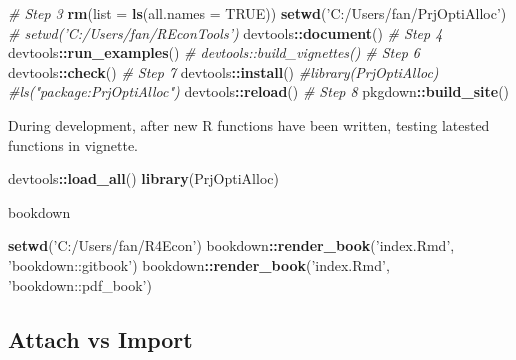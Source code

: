 \documentclass[
]{article}
\newenvironment{Shaded}{\begin{snugshade}}{\end{snugshade}}
\newcommand{\CommentTok}[1]{\textcolor[rgb]{0.56,0.35,0.01}{\textit{#1}}}
\newcommand{\DataTypeTok}[1]{\textcolor[rgb]{0.13,0.29,0.53}{#1}}
\newcommand{\KeywordTok}[1]{\textcolor[rgb]{0.13,0.29,0.53}{\textbf{#1}}}
\newcommand{\NormalTok}[1]{#1}
\newcommand{\OperatorTok}[1]{\textcolor[rgb]{0.81,0.36,0.00}{\textbf{#1}}}
\newcommand{\OtherTok}[1]{\textcolor[rgb]{0.56,0.35,0.01}{#1}}
\newcommand{\StringTok}[1]{\textcolor[rgb]{0.31,0.60,0.02}{#1}}
\begin{document}
\begin{Shaded}
\begin{Highlighting}[]
\CommentTok{# Step 3}
\KeywordTok{rm}\NormalTok{(}\DataTypeTok{list =} \KeywordTok{ls}\NormalTok{(}\DataTypeTok{all.names =} \OtherTok{TRUE}\NormalTok{))}
\KeywordTok{setwd}\NormalTok{(}\StringTok{'C:/Users/fan/PrjOptiAlloc'}\NormalTok{)}
\CommentTok{# setwd('C:/Users/fan/REconTools')}
\NormalTok{devtools}\OperatorTok{::}\KeywordTok{document}\NormalTok{()}
\CommentTok{# Step 4}
\NormalTok{devtools}\OperatorTok{::}\KeywordTok{run_examples}\NormalTok{()}
\CommentTok{# devtools::build_vignettes()}
\CommentTok{# Step 6}
\NormalTok{devtools}\OperatorTok{::}\KeywordTok{check}\NormalTok{()}
\CommentTok{# Step 7}
\NormalTok{devtools}\OperatorTok{::}\KeywordTok{install}\NormalTok{()}
\CommentTok{#library(PrjOptiAlloc)}
\CommentTok{#ls("package:PrjOptiAlloc")}
\NormalTok{devtools}\OperatorTok{::}\KeywordTok{reload}\NormalTok{()}
\CommentTok{# Step 8}
\NormalTok{pkgdown}\OperatorTok{::}\KeywordTok{build_site}\NormalTok{()}
\end{Highlighting}
\end{Shaded}

During development, after new R functions have been written, testing
latested functions in vignette.

\begin{Shaded}
\begin{Highlighting}[]
\NormalTok{devtools}\OperatorTok{::}\KeywordTok{load_all}\NormalTok{()}
\KeywordTok{library}\NormalTok{(PrjOptiAlloc)}
\end{Highlighting}
\end{Shaded}

bookdown

\begin{Shaded}
\begin{Highlighting}[]
\KeywordTok{setwd}\NormalTok{(}\StringTok{'C:/Users/fan/R4Econ'}\NormalTok{)}
\NormalTok{bookdown}\OperatorTok{::}\KeywordTok{render_book}\NormalTok{(}\StringTok{'index.Rmd'}\NormalTok{, }\StringTok{'bookdown::gitbook'}\NormalTok{)}
\NormalTok{bookdown}\OperatorTok{::}\KeywordTok{render_book}\NormalTok{(}\StringTok{'index.Rmd'}\NormalTok{, }\StringTok{'bookdown::pdf_book'}\NormalTok{)}
\end{Highlighting}
\end{Shaded}

\hypertarget{attach-vs-import}{%
\subsection{Attach vs Import}\label{attach-vs-import}}
\end{document}
